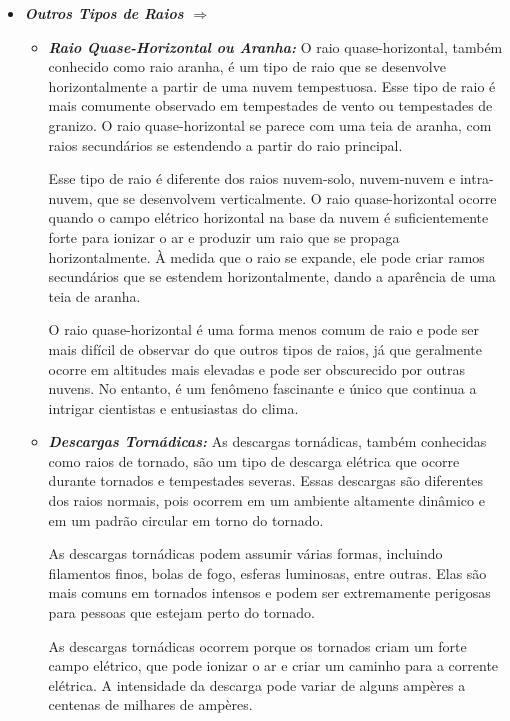 \documentclass[a4paper, 12pt, onecolumn,singlespacing]{article}
\begin{document}
\begin{itemize}
\begin{itemize}
		\end{itemize}
		
		\item \textbf{\textit{Outros Tipos de Raios $\Rightarrow$ }}
		\begin{itemize}
			\item \textbf{\textit{Raio Quase-Horizontal ou Aranha: }}O raio quase-horizontal, também conhecido como raio aranha, é um tipo de raio que se desenvolve horizontalmente a partir de uma nuvem tempestuosa. Esse tipo de raio é mais comumente observado em tempestades de vento ou tempestades de granizo. O raio quase-horizontal se parece com uma teia de aranha, com raios secundários se estendendo a partir do raio principal.
			
			Esse tipo de raio é diferente dos raios nuvem-solo, nuvem-nuvem e intra-nuvem, que se desenvolvem verticalmente. O raio quase-horizontal ocorre quando o campo elétrico horizontal na base da nuvem é suficientemente forte para ionizar o ar e produzir um raio que se propaga horizontalmente. À medida que o raio se expande, ele pode criar ramos secundários que se estendem horizontalmente, dando a aparência de uma teia de aranha.
			
			O raio quase-horizontal é uma forma menos comum de raio e pode ser mais difícil de observar do que outros tipos de raios, já que geralmente ocorre em altitudes mais elevadas e pode ser obscurecido por outras nuvens. No entanto, é um fenômeno fascinante e único que continua a intrigar cientistas e entusiastas do clima.
			
			\item \textbf{\textit{Descargas Tornádicas: }}As descargas tornádicas, também conhecidas como raios de tornado, são um tipo de descarga elétrica que ocorre durante tornados e tempestades severas. Essas descargas são diferentes dos raios normais, pois ocorrem em um ambiente altamente dinâmico e em um padrão circular em torno do tornado.
			
			As descargas tornádicas podem assumir várias formas, incluindo filamentos finos, bolas de fogo, esferas luminosas, entre outras. Elas são mais comuns em tornados intensos e podem ser extremamente perigosas para pessoas que estejam perto do tornado.
			
			As descargas tornádicas ocorrem porque os tornados criam um forte campo elétrico, que pode ionizar o ar e criar um caminho para a corrente elétrica. A intensidade da descarga pode variar de alguns ampères a centenas de milhares de ampères.
			

\end{itemize}
\end{itemize}
\end{document}
